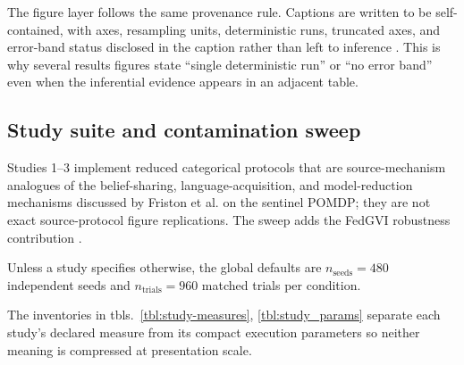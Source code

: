 \documentclass[
  english,
]{article}
\theoremstyle{plain}
\theoremstyle{definition}
\theoremstyle{remark}
\theoremstyle{definition}
\begin{document}
The figure layer follows the same provenance rule. Captions are written
to be self-contained, with axes, resampling units, deterministic runs,
truncated axes, and error-band status disclosed in the caption rather
than left to inference
\citep{rougier2014figures, midway2020visualization}. This is why several
results figures state ``single deterministic run'' or ``no error band''
even when the inferential evidence appears in an adjacent table.

\subsection{Study suite and contamination
sweep}\label{sec:methods-studies}

Studies 1--3 implement reduced categorical protocols that are
source-mechanism analogues of the belief-sharing, language-acquisition,
and model-reduction mechanisms discussed by Friston et al.
\citeyearpar{friston2024federated} on the sentinel POMDP; they are not
exact source-protocol figure replications. The sweep adds the FedGVI
robustness contribution \citep{mildner2025fedgvi}.

Unless a study specifies otherwise, the global defaults are
\(n_{\text{seeds}} = 480\) independent seeds and
\(n_{\text{trials}} = 960\) matched trials per condition.

The inventories in
tbls.~\ref{tbl:study-measures}, \ref{tbl:study_params} separate each
study's declared measure from its compact execution parameters so
neither meaning is compressed at presentation scale.
\end{document}
